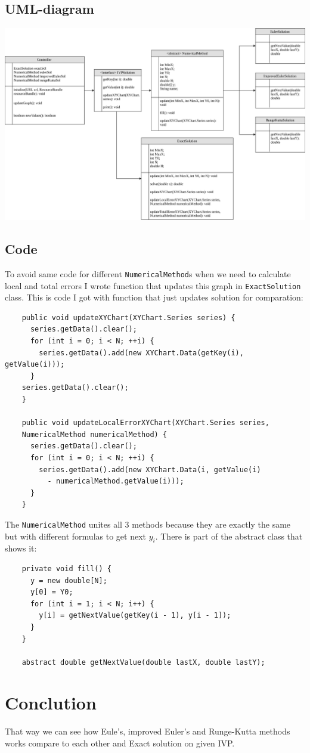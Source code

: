\documentclass{article}
\begin{document}
  \subsection{UML-diagram}
  \includegraphics[scale=0.5]{UML.png}

  \subsection{Code}
  To avoid same code for different \texttt{NumericalMethod}s when we need to calculate local and total errors
  I wrote function that updates this graph in \texttt{ExactSolution} class. This is code I got with function
  that just updates solution for comparation:


  \begin{verbatim}
    public void updateXYChart(XYChart.Series series) {
      series.getData().clear();
      for (int i = 0; i < N; ++i) {
        series.getData().add(new XYChart.Data(getKey(i), getValue(i)));
      }
    series.getData().clear();
    }

    public void updateLocalErrorXYChart(XYChart.Series series,
    NumericalMethod numericalMethod) {
      series.getData().clear();
      for (int i = 0; i < N; ++i) {
        series.getData().add(new XYChart.Data(i, getValue(i)
          - numericalMethod.getValue(i)));
      }
    }

  \end{verbatim}

  The \texttt{NumericalMethod} unites all 3 methods because they are exactly the same
  but with different formulas to get next $y_i$. There is part of the abstract class that shows it:

  \begin{verbatim}
    private void fill() {
      y = new double[N];
      y[0] = Y0;
      for (int i = 1; i < N; i++) {
        y[i] = getNextValue(getKey(i - 1), y[i - 1]);
      }
    }

    abstract double getNextValue(double lastX, double lastY);
  \end{verbatim}

  \section{Conclution}

  That way we can see how Eule's, improved Euler's and Runge-Kutta methods works compare to each other
  and Exact solution on given IVP.
\end{document}
